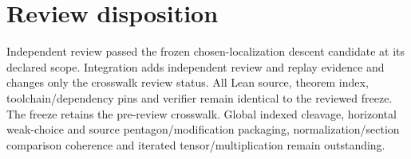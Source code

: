 \documentclass{article}
\begin{document}
\section*{Review disposition}
Independent review passed the frozen chosen-localization descent candidate at its declared scope. Integration adds independent review and replay evidence and changes only the crosswalk review status. All Lean source, theorem index, toolchain/dependency pins and verifier remain identical to the reviewed freeze. The freeze retains the pre-review crosswalk. Global indexed cleavage, horizontal weak-choice and source pentagon/modification packaging, normalization/section comparison coherence and iterated tensor/multiplication remain outstanding.
\end{document}
